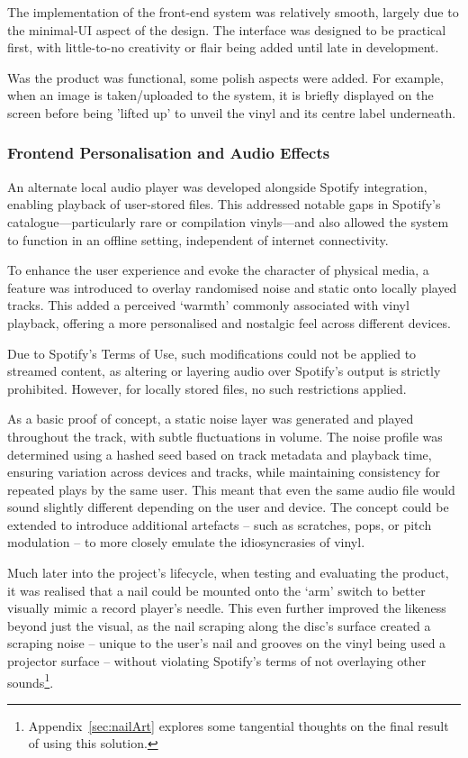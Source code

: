    
            The implementation of the front-end system was relatively smooth, largely due to the minimal-UI aspect of the design. The interface was designed to be practical first, with little-to-no creativity or flair being added until late in development.
    
            Was the product was functional, some polish aspects were added. For example, when an image is taken/uploaded to the system, it is briefly displayed on the screen before being 'lifted up' to unveil the vinyl and its centre label underneath.
    
            \subsubsection{Frontend Personalisation and Audio Effects}
    
            An alternate local audio player was developed alongside Spotify integration, enabling playback of user-stored files. This addressed notable gaps in Spotify’s catalogue—particularly rare or compilation vinyls—and also allowed the system to function in an offline setting, independent of internet connectivity.
    
            To enhance the user experience and evoke the character of physical media, a feature was introduced to overlay randomised noise and static onto locally played tracks. This added a perceived ‘warmth’ commonly associated with vinyl playback, offering a more personalised and nostalgic feel across different devices.
            
            Due to Spotify’s Terms of Use, such modifications could not be applied to streamed content, as altering or layering audio over Spotify’s output is strictly prohibited. However, for locally stored files, no such restrictions applied.
            
            As a basic proof of concept, a static noise layer was generated and played throughout the track, with subtle fluctuations in volume. The noise profile was determined using a hashed seed based on track metadata and playback time, ensuring variation across devices and tracks, while maintaining consistency for repeated plays by the same user. This meant that even the same audio file would sound slightly different depending on the user and device. The concept could be extended to introduce additional artefacts -- such as scratches, pops, or pitch modulation -- to more closely emulate the idiosyncrasies of vinyl.
    
            Much later into the project's lifecycle, when testing and evaluating the product, it was realised that a nail could be mounted onto the `arm' switch to better visually mimic a record player's needle. This even further improved the likeness beyond just the visual, as the nail scraping along the disc's surface created a scraping noise -- unique to the user's nail and grooves on the vinyl being used a projector surface -- without violating Spotify's terms of not overlaying other sounds\footnote{Appendix~\ref{sec:nailArt} explores some tangential thoughts on the final result of using this solution.}.
        

